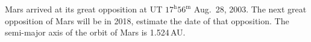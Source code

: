 Mars arrived at its great opposition at UT $17^{\mathrm{h}}56^{\mathrm{m}}$
Aug.\ 28, 2003. The next great opposition of Mars will be in 2018, estimate the
date of that opposition. The semi-major axis of the orbit of Mars is
1.524\,AU.
